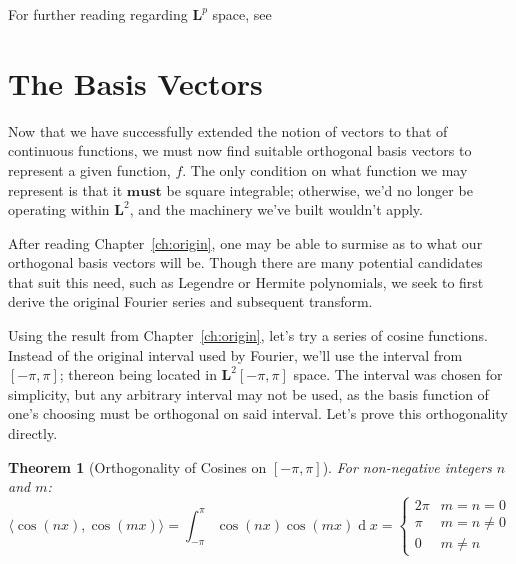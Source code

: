 \documentclass[12pt,a4paper]{report}
\DeclareMathOperator{\deriv}{d}
\theoremstyle{thms}
\newtheorem{theorem}{Theorem}[section]
\theoremstyle{defns}
\begin{document}
For further reading regarding $\mathbf{L}^p$ space, see \cite{holland_schwarz_l2}


\section{The Basis Vectors}

Now that we have successfully extended the notion of vectors to that of continuous functions, we must now find suitable orthogonal basis vectors to represent a given function, $f$. The only condition on what function we may represent is that it $\textbf{must}$ be square integrable; otherwise, we'd no longer be operating within $\mathbf{L}^2$, and the machinery we've built wouldn't apply.

After reading Chapter~\ref{ch:origin}, one may be able to surmise as to what our orthogonal basis vectors will be. Though there are many potential candidates that suit this need, such as Legendre or Hermite polynomials, we seek to first derive the original Fourier series and subsequent transform.

Using the result from Chapter~\ref{ch:origin}, let's try a series of cosine functions. Instead of the original interval used by Fourier, we'll use the interval from $[-\pi, \pi]$; thereon being located in $\mathbf{L}^2[-\pi, \pi]$ space. The interval was chosen for simplicity, but any arbitrary interval may not be used, as the basis function of one's choosing must be orthogonal on said interval. Let's prove this orthogonality directly.

\begin{theorem}[Orthogonality of Cosines on ${[-\pi, \pi]}$]
    For non-negative integers $n$ and $m$:
    \begin{equation}
        \langle \cos(nx), \cos(mx) \rangle = \int_{-\pi}^{\pi} \cos(nx)\cos(mx)\deriv{x} = \begin{cases}
            2\pi & m = n = 0 \\
            \pi  & m = n \neq 0 \\
            0    & m \neq n
        \end{cases}
    \end{equation}
\end{theorem}
\end{document}
